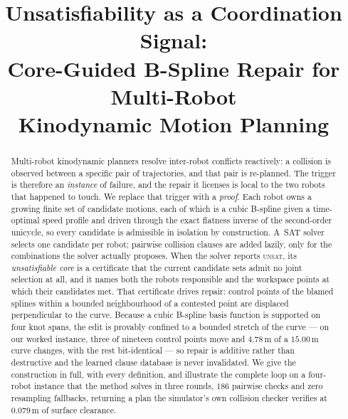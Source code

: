 \documentclass[conference]{IEEEtran}
\begin{document}
\title{Unsatisfiability as a Coordination Signal:\\
Core-Guided B-Spline Repair for Multi-Robot\\
Kinodynamic Motion Planning}

\author{
}

\maketitle

\begin{abstract}
Multi-robot kinodynamic planners resolve inter-robot conflicts reactively: a collision is
observed between a specific pair of trajectories, and that pair is re-planned. The trigger
is therefore an \emph{instance} of failure, and the repair it licenses is local to the two
robots that happened to touch. We replace that trigger with a \emph{proof}. Each robot owns
a growing finite set of candidate motions, each of which is a cubic B-spline given a
time-optimal speed profile and driven through the exact flatness inverse of the
second-order unicycle, so every candidate is admissible in isolation by construction.
A~SAT solver selects one candidate per robot; pairwise collision clauses are added lazily,
only for the combinations the solver actually proposes. When the solver reports
\textsc{unsat}, its \emph{unsatisfiable core} is a certificate that the current candidate
sets admit no joint selection at all, and it names both the robots responsible and the
workspace points at which their candidates met. That certificate drives repair: control
points of the blamed splines within a bounded neighbourhood of a contested point are
displaced perpendicular to the curve. Because a cubic B-spline basis function is supported
on four knot spans, the edit is provably confined to a bounded stretch of the curve --- on
our worked instance, three of nineteen control points move and $4.78$\,m of a $15.00$\,m
curve changes, with the rest bit-identical --- so repair is additive rather than
destructive and the learned clause database is never invalidated. We give the construction
in full, with every definition, and illustrate the complete loop on a four-robot instance
that the method solves in three rounds, $186$ pairwise checks and zero resampling
fallbacks, returning a plan the simulator's own collision checker verifies at
$0.079$\,m of surface clearance.
\end{abstract}
\end{document}
